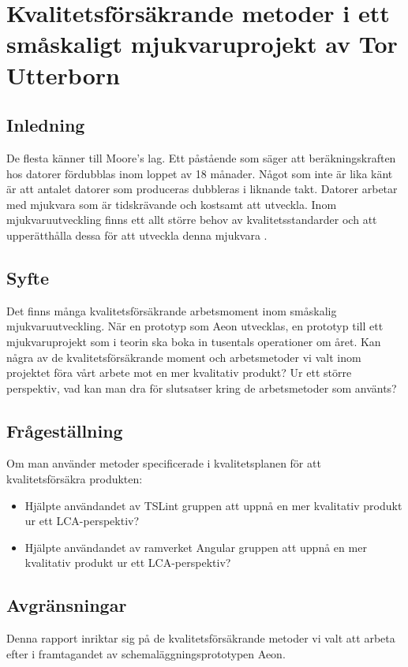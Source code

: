 \chapter{Kvalitetsförsäkrande metoder i ett småskaligt mjukvaruprojekt av Tor Utterborn}

\section{Inledning}

De flesta känner till Moore's lag. Ett påstående som säger att beräkningskraften hos datorer fördubblas inom loppet av 18 månader. 
Något som inte är lika känt är att antalet datorer som produceras dubbleras i liknande takt. \cite{greenbiz}
Datorer arbetar med mjukvara som är tidskrävande och kostsamt att utveckla. Inom mjukvaruutveckling finns ett allt större behov av kvalitetsstandarder och att upperätthålla dessa för att utveckla denna mjukvara \cite{linkedin}.

\section{Syfte}

Det finns många kvalitetsförsäkrande arbetsmoment inom småskalig mjukvaruutveckling. När en prototyp som Aeon utvecklas, en prototyp till ett mjukvaruprojekt som i teorin ska boka in tusentals operationer om året. Kan några av de kvalitetsförsäkrande moment och arbetsmetoder vi valt inom projektet föra vårt arbete mot en mer kvalitativ produkt? Ur ett större perspektiv, vad kan man dra för slutsatser kring de arbetsmetoder som använts?

\section{Frågeställning}

Om man använder metoder specificerade i kvalitetsplanen för att kvalitetsförsäkra produkten: 
\begin{itemize}
	\item Hjälpte användandet av TSLint gruppen att uppnå en mer kvalitativ produkt ur ett LCA-perspektiv?
	\item Hjälpte användandet av ramverket Angular gruppen att uppnå en mer kvalitativ produkt ur ett LCA-perspektiv?
\end{itemize}

\section{Avgränsningar}
Denna rapport inriktar sig på de kvalitetsförsäkrande metoder vi valt att arbeta efter i framtagandet av schemaläggningsprototypen Aeon.
\clearpage
